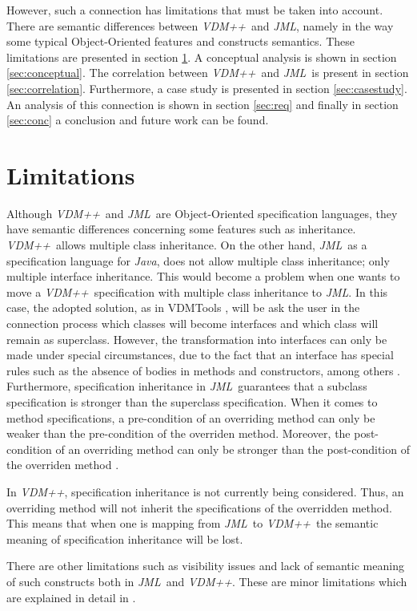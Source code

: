 \documentclass{llncs}
\newcommand{\jml}{\textit{JML}}
\newcommand{\vpp}{\textit{VDM++}}
\newcommand{\java}{\textit{Java}}
\begin{document}
However, such a connection has limitations that must be taken into account. There are semantic differences between \vpp\ and \jml, namely in the way some typical Object-Oriented features and constructs semantics. These limitations are presented in section \ref{sec:limitation}. A conceptual analysis is shown in section \ref{sec:conceptual}. The correlation between \vpp\ and \jml\ is present in section \ref{sec:correlation}. Furthermore, a case study is presented in section \ref{sec:casestudy}. An analysis of this connection is shown in section \ref{sec:req} and finally in section \ref{sec:conc} a conclusion and future work can be found.

\section{Limitations}
\label{sec:limitation}

Although \vpp\ and \jml\ are Object-Oriented specification languages, they have semantic differences concerning some features such as inheritance. 
\vpp\ allows multiple class inheritance. On the other hand, \jml\, as a specification language for \java, does not allow multiple class inheritance; only multiple interface inheritance. This would become a problem when one wants to move a \vpp\ specification with multiple class inheritance to \jml. In this case, the adopted solution, as in VDMTools \cite{vdmtools}, will be ask the user in the connection process which classes will become interfaces and which class will remain as superclass. However, the transformation into interfaces can only be made under special circumstances, due to the fact that an interface has special rules such as the absence of bodies in methods and constructors, among others \cite{vppjmlthesis}. Furthermore, specification inheritance in \jml\ guarantees that a subclass specification is stronger than the superclass specification. When it comes to method specifications, a pre-condition of an overriding method can only be weaker than the pre-condition of the overriden method. Moreover, the post-condition of an overriding method can only be stronger than the post-condition of the overriden method \cite{ASVJMLESCJ}.

In \vpp, specification inheritance is not currently being considered. Thus, an overriding method will not inherit the specifications of the overridden method. This means that when one is mapping from \jml\ to \vpp\, the semantic meaning of specification inheritance will be lost. 

There are other limitations such as visibility issues and lack of semantic meaning of such constructs both in \jml\ and \vpp. These are minor limitations which are explained in detail in \cite{vppjmlthesis}.
\end{document}
